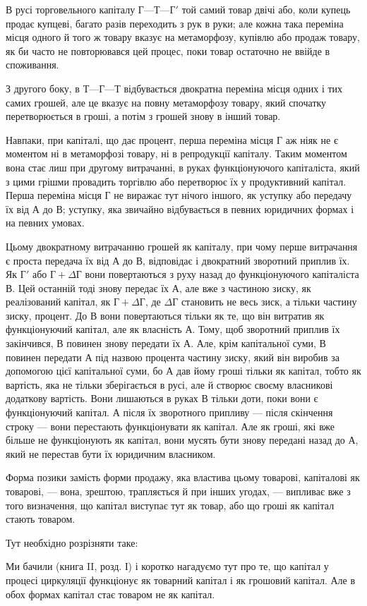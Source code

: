 В русі торговельного капіталу $Г — Т — Г'$ той самий товар
двічі або, коли купець продає купцеві, багато разів переходить
з рук в руки; але кожна така переміна місця одного й того ж
товару вказує на метаморфозу, купівлю або продаж товару,
як би часто не повторювався цей процес, поки товар остаточно
не ввійде в споживання.

З другого боку, в $Т — Г — Т$ відбувається двократна переміна
місця одних і тих самих грошей, але це вказує на повну
метаморфозу товару, який спочатку перетворюється в гроші,
а потім з грошей знову в інший товар.

Навпаки, при капіталі, що дає процент, перша переміна місця
$Г$ аж ніяк не є моментом ні в метаморфозі товару, ні в репродукції
капіталу. Таким моментом вона стає лиш при другому
витрачанні, в руках функціонуючого капіталіста, який з цими
грішми провадить торгівлю або перетворює їх у продуктивний
капітал. Перша переміна місця $Г$ не виражає тут нічого іншого,
як уступку або передачу їх від $А$ до $В$; уступку, яка звичайно
відбувається в певних юридичних формах і на певних умовах.

Цьому двократному витрачанню грошей як капіталу, при
чому перше витрачання є проста передача їх від $А$ до $В$, відповідає
і двократний зворотний приплив їх. Як $Г'$ або $Г + ΔГ$ вони
повертаються з руху назад до функціонуючого капіталіста В.
Цей останній тоді знову передає їх $А$, але вже з частиною
зиску, як реалізований капітал, як $Г + ΔГ$, де $ΔГ$ становить
не весь зиск, а тільки частину зиску, процент. До $В$ вони повертаються
тільки як те, що він витратив як функціонуючий
капітал, але як власність $А$. Тому, щоб зворотний приплив їх
закінчився, $В$ повинен знову передати їх $А$. Але, крім капітальної
суми, $В$ повинен передати $А$ під назвою процента частину
зиску, який він виробив за допомогою цієї капітальної суми,
бо $А$ дав йому гроші тільки як капітал, тобто як вартість, яка
не тільки зберігається в русі, але й створює своєму власникові
додаткову вартість. Вони лишаються в руках $В$ тільки доти,
поки вони є функціонуючий капітал. А після їх зворотного
припливу — після скінчення строку — вони перестають функціонувати
як капітал. Але як гроші, які вже більше не функціонують
як капітал, вони мусять бути знову передані назад до $А$,
який не перестав бути їх юридичним власником.

Форма позики замість форми продажу, яка властива цьому
товарові, капіталові як товарові, — вона, зрештою, трапляється
й при інших угодах, — випливає вже з того визначення, що
капітал виступає тут як товар, або що гроші як капітал стають
товаром.

Тут необхідно розрізняти таке:

Ми бачили (книга II, розд. І) і коротко нагадуємо тут про те,
що капітал у процесі циркуляції функціонує як товарний капітал
і як грошовий капітал. Але в обох формах капітал стає
товаром не як капітал.
